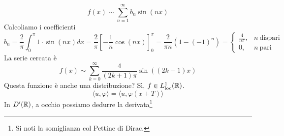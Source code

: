 \Soluzione
\begin{equation*}
f( x) \sim \sum\limits ^{\infty }_{n=1} b_{n}\sin( nx)
\end{equation*}
Calcoliamo i coefficienti
\begin{equation*}
b_{n} =\frac{2}{\pi }\int ^{\pi }_{0} 1\cdotp \sin( nx) dx=\frac{2}{\pi }\left[ -\frac{1}{n}\cos( nx)\right]^{\pi }_{0} =\frac{2}{\pi n}\left( 1-( -1)^{n}\right) =\begin{cases}
\frac{4}{n\pi } , & n\ \text{dispari}\\
0, & n\ \text{pari}
\end{cases}
\end{equation*}
La serie cercata è
\begin{equation*}
f( x) \sim \sum\limits ^{\infty }_{k=0}\frac{4}{( 2k+1) \pi }\sin(( 2k+1) x)
\end{equation*}
Questa funzione è anche una distribuzione? Sì, $f\in L^{1}_{\mathrm{loc}}(\mathbb{R} )$.
\begin{equation*}
\langle u,\varphi \rangle =\langle u,\varphi ( x+T) \rangle 
\end{equation*}
In $D'(\mathbb{R} )$, a occhio possiamo dedurre la derivata\footnote{Si noti la somiglianza col Pettine di Dirac.}



